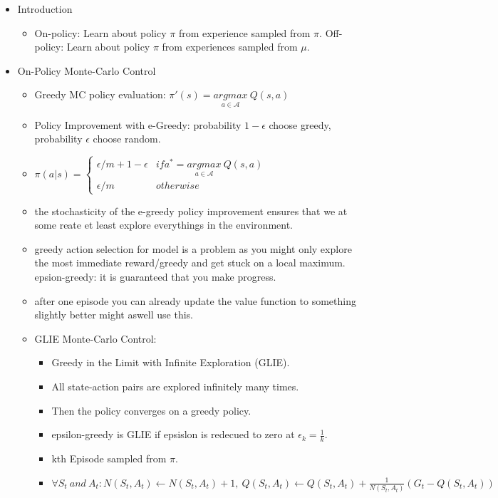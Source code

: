\begin{itemize}[noitemsep,nolistsep]
	\item Introduction
	\begin{itemize}[noitemsep,nolistsep]
		\item On-policy: Learn about policy $\pi$ from experience sampled from $\pi$. Off-policy: Learn about policy $\pi$ from experiences sampled from $\mu$.
	\end{itemize}
	\item On-Policy Monte-Carlo Control
	\begin{itemize}[noitemsep,nolistsep]
		\item Greedy MC policy evaluation: $\pi'(s) = \underset{a \in \mathcal{A}}{argmax}\ Q(s,a)$ 
		\item Policy Improvement with e-Greedy: probability $1 - \epsilon$ choose greedy, probability $\epsilon$ choose random.
		\item $\pi(a|s) = \begin{cases} \epsilon/m + 1 - \epsilon & if a^* = \underset{a \in \mathcal{A}}{argmax}\ Q(s,a) \\ \epsilon/m & otherwise \end{cases}$
		\item the stochasticity of the e-greedy policy improvement ensures that we at some reate et least explore everythings in the environment.
		\item greedy action selection for model is a problem as you might only explore the most immediate reward/greedy and get stuck on a local maximum. epsion-greedy: it is guaranteed that you make progress.
		\item after one episode you can already update the value function to something slightly better might aswell use this.
		\item GLIE Monte-Carlo Control:
		\begin{itemize}[noitemsep,nolistsep]
			\item Greedy in the Limit with Infinite Exploration (GLIE).
			\item All state-action pairs are explored infinitely many times.
			\item Then the policy converges on a greedy policy.
			\item epsilon-greedy is GLIE if epsislon is redecued to zero at $\epsilon_k = \frac{1}{k}$.
			\item kth Episode sampled from $\pi$.
			\item $\forall S_t\ and\ A_t: N(S_t,A_t) \leftarrow N(S_t,A_t) + 1,\ Q(S_t,A_t) \leftarrow Q(S_t,A_t) + \frac{1}{N(S_t,A_t)}(G_t - Q(S_t,A_t))$

\end{itemize}
\end{itemize}
\end{itemize}
